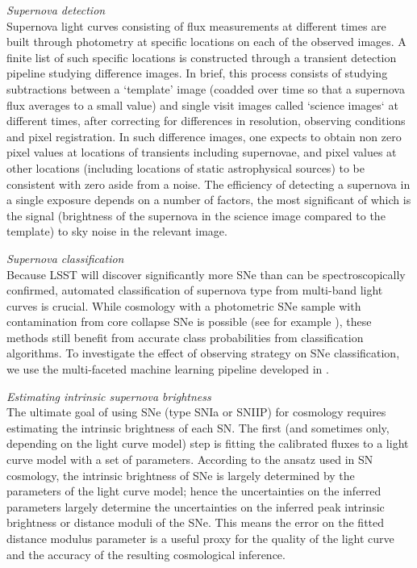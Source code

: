 {\emph{Supernova detection}}\\
Supernova light curves consisting of flux measurements at different times are built through photometry
at specific locations on each of the observed images. A finite list of such specific locations is
constructed through a transient detection pipeline studying difference images. In brief, this process 
consists of studying subtractions between a  `template' image (coadded over time so that a supernova
flux averages to a small value) and single visit images called `science images` at different times,
after correcting for differences in resolution, observing conditions and pixel registration. In such 
difference images, one expects to obtain non zero pixel values at locations of transients including
supernovae, and pixel values at other locations (including locations of static astrophysical 
sources) to be
consistent with zero aside from a noise. The efficiency of detecting a supernova in a single 
exposure
depends on a number of factors, the most significant of which is the signal (brightness of the supernova
in the science image compared to the template) to sky noise in the relevant image.


{\emph{Supernova classification}}\\
Because LSST will discover significantly more SNe than can be spectroscopically confirmed, 
automated classification of supernova type from multi-band light curves is crucial. While cosmology 
with a photometric SNe sample with contamination from core collapse SNe is possible (see for 
example \citet{Kunz2007,Newling2011,Hlozek2012,Knights2013,Bernstein2012,Campbell2013,Rubin2015}), 
these methods still benefit from accurate class probabilities from classification algorithms. To 
investigate the effect of observing strategy on SNe classification, we use the multi-faceted machine 
learning pipeline developed in \citet{Lochner2016}.


{\emph{Estimating intrinsic supernova brightness}}\\
The ultimate goal of using SNe (type SNIa or
SNIIP) for cosmology requires estimating the intrinsic brightness of each SN. The first (and 
sometimes only, depending on the light curve
model) step is fitting the calibrated fluxes to a light curve model with
a set of parameters. According to the ansatz used in SN cosmology, the
intrinsic brightness of SNe is largely determined by the parameters of
the light curve model; hence the uncertainties on the inferred
parameters largely determine the uncertainties on the inferred peak
intrinsic brightness or distance moduli of the SNe. This means the error on the fitted distance 
modulus parameter is a useful proxy for the quality of the light curve and the accuracy of 
the resulting cosmological inference.


